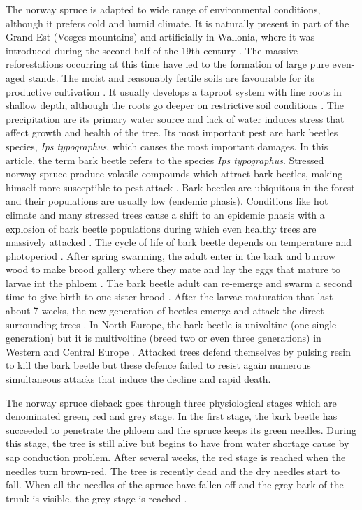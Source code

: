 \documentclass[3p,procedia]{elsarticle}
\begin{document}
The norway spruce is adapted to wide range of environmental conditions, although it prefers cold and humid climate.
It is naturally present in part of the Grand-Est (Vosges mountains) and artificially in Wallonia, where it was introduced during the second half of the 19th century \citep{Noirfalise_1975}.
The massive reforestations occurring at this time have led to the formation of large pure even-aged stands.
The moist and reasonably fertile soils are favourable for its productive cultivation \citep{horgan_guide_2003}.
It usually develops a taproot system with fine roots in shallow depth, although the roots go deeper on restrictive soil conditions \citep{puhe_roots_2003}.   
The precipitation are its primary water source \citep{tjoelker_outline_2007} and lack of water induces stress that affect growth and health of the tree. 
Its most important pest are bark beetles species, \textit{Ips typographus}, which causes the most important damages.
In this article, the term bark beetle refers to the species \textit{Ips typographus}.
Stressed norway spruce produce volatile compounds which attract bark beetles, making himself more susceptible to pest attack \citep{netherer_waterlimiting_2015,netherer_interactions_2021}.
Bark beetles are ubiquitous in the forest and their populations are usually low (endemic phasis).
Conditions like hot climate and many stressed trees cause a shift to an epidemic phasis with a explosion of bark beetle populations during which even healthy trees are massively attacked \citep{kautz_individual_2014}.
The cycle of life of bark beetle depends on temperature and photoperiod \citep{baier_phenipscomprehensive_2007,annila_influence_1969}.
After spring swarming, the adult enter in the bark and burrow wood to make brood gallery where they mate and lay the eggs that mature to larvae int the phloem \citep{hlasny_bark_2021}.
The bark beetle adult can re-emerge and swarm a second time to give birth to one sister brood \citep{zolubas_1995}.
After the larvae maturation that last about 7 weeks, the new generation of beetles emerge and attack the direct surrounding trees \citep{zolubas_1995}.
In North Europe, the bark beetle is univoltine (one single generation) but it is multivoltine (breed two or even three generations) in Western and Central Europe \citep{annila_influence_1969}.
Attacked trees defend themselves by pulsing resin to kill the bark beetle but these defence failed to resist again numerous simultaneous attacks that induce the decline and rapid death.

The norway spruce dieback goes through three physiological stages which are denominated green, red and grey stage.
In the first stage, the bark beetle has succeeded to penetrate the phloem and the spruce keeps its green needles. 
During this stage, the tree is still alive but begins to have from water shortage cause by sap conduction problem. 
After several weeks, the red stage is reached when the needles turn brown-red. The tree is recently dead and the dry needles start to fall.
When all the needles of the spruce have fallen off and the grey bark of the trunk is visible, the grey stage is reached \citep{abdullah_european_2018}. 
\end{document}
